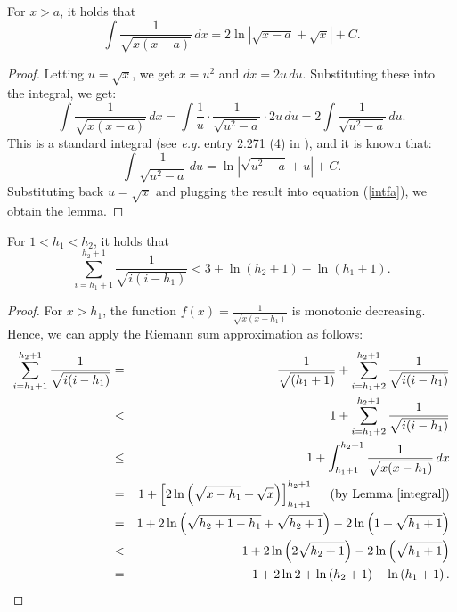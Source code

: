 \documentclass[11pt]{article}
\begin{document}
\begin{lemma}\label{integral}
For $x > a$, it holds that
    \[
    \int \frac{1}{\sqrt{x(x-a)}}\, dx = 2 \ln\left|  \sqrt{x - a} + \sqrt{x} \right| + C.
    \]
\end{lemma}
\begin{proof}
     Letting $ u = \sqrt{x} $, we get $x = u^2$  and  $dx = 2u \, du$.
Substituting these into the integral, we get:
\begin{equation}\label{intfa}
\int \frac{1}{\sqrt{x(x-a)}} \, dx = \int \frac{1}{u} \cdot \frac{1}{\sqrt{u^2 - a}} \cdot 2u \, du
 = 2 \int  \frac{1}{\sqrt{u^2 - a}} \, du .    
\end{equation}
This is a standard integral (see \textit{e.g.} entry 2.271 (4) in \cite{gradshteyn2007}), 
and it is known that:
\[
\int \frac{1}{\sqrt{u^2 - a}} \, du = \ln\left| \sqrt{u^2 - a} + u   \right| + C.
\]
Substituting back $ u = \sqrt{x}$ and plugging the result 
into equation (\ref{intfa}), we obtain the lemma.

\end{proof}

\begin{lemma}\label{sum}
For $1 < h_1 < h_2$, it holds that
     \[
     \sum_{i = h_1 + 1}^{h_2 + 1} \frac{1}{\sqrt{i(i- h_1)}} 
     < 3 + \ln\left( {h_2+1} \right) - \ln\left({h_1+1}\right) .
     \]
\end{lemma}

\begin{proof}
    For $x > h_1$, the function $f(x) = \frac{1}{\sqrt{x(x -h_1)}}$ is monotonic decreasing. 
    Hence, we can apply the Riemann sum approximation as follows:
    \begin{eqnarray*}\label{eq:split}
    \sum_{i=h_1 + 1}^{h_2 + 1} \frac{1}{\sqrt{i(i - h_1)}} 
      & =   & \frac{1}{\sqrt{(h_1+1)}} + \sum_{i=h_1+2}^{h_2+1} \frac{1}{\sqrt{i(i-h_1)}}  \\
      & <   & 1 + \sum_{i=h_1 + 2}^{h_2 + 1} \frac{1}{\sqrt{i(i- h_1)}} \\
      & \le &  1 + \int_{h_1 + 1}^{h_2 + 1} \frac{1}{\sqrt{x(x- h_1)}}\, dx \\     
      & =   & 1 + \left[ 2\ln\left(\sqrt{x - h_1} + \sqrt{x} \right) \right]_{h_1 +1}^{h_2+1}
              \,\,\,\,\,\,\,\, \text{(by Lemma \ref{integral})}\\
      & =   & 1+ 2\ln \left(\sqrt{h_2 + 1 -h_1} + \sqrt{h_2 + 1}\right) - 
                   2\ln \left(1 + \sqrt{h_1+1}  \right)  \\
      & <   & 1  + 2\ln\left(2\sqrt{h_2+1}\right)-2\ln\left(\sqrt{h_1+1}\right) \\
      & =   & 1  + 2 \ln 2 + \ln\left( {h_2+1} \right) - \ln\left({h_1+1}\right) .
    \end{eqnarray*}    
\end{proof}
\end{document}
